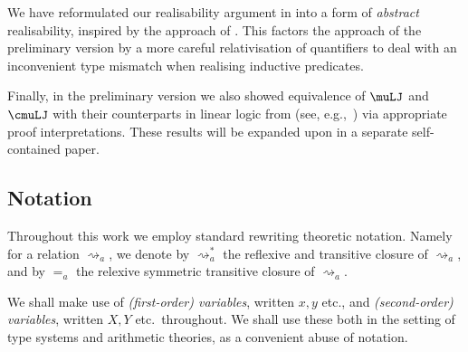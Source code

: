 We have reformulated our realisability argument in  into a form of \emph{abstract} realisability, inspired by the approach of \cite{BerTsu21:ifp}. 
This factors the approach of the preliminary version by a more careful relativisation of quantifiers to deal with an inconvenient type mismatch when realising inductive predicates.

Finally, in the preliminary version we also showed equivalence of $\muLJ$ and $\cmuLJ$ with their counterparts in linear logic from (see, e.g.,~\cite{Baelde12,BaeldeDS16Infinitaryprooftheory}) via appropriate proof interpretations.
These results will be expanded upon in a separate self-contained paper.

\subsection{Notation}
% 
Throughout this work we employ standard rewriting theoretic notation. 
Namely for a relation $\rightsquigarrow_a$, we denote by $\rightsquigarrow^*_a$ the reflexive and transitive closure of $\rightsquigarrow_a$, and by $=_{a}$ the relexive symmetric transitive closure of $\rightsquigarrow_a$.

We shall make use of \emph{(first-order) variables}, written $x,y$ etc., and \emph{(second-order) variables}, written $X,Y$ etc.\ throughout.
We shall use these both in the setting of type systems and arithmetic theories, as a convenient abuse of notation.

